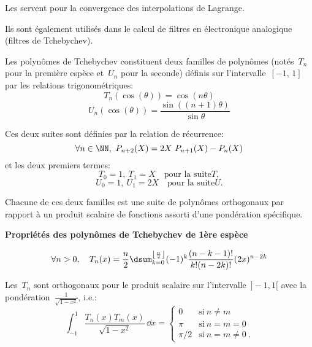 Les  servent pour la convergence des interpolations de Lagrange.

Ils sont également utilisés dans le calcul de filtres en électronique analogique (filtres de Tchebychev).

\medskip
Les polynômes de Tchebychev 
constituent deux familles de polynômes (notés~$T_n$ 
pour la première espèce et~$U_n$ pour la seconde) définis sur l'intervalle~$[-1,\, 1]$ par 
les relations trigonométriques:
\begin{equation}
  T_n(\cos(\theta))=\cos(n\theta)
\end{equation}
\begin{equation}
  U_n(\cos(\theta))=\frac{\sin((n+1) \theta)}{\sin \theta}
\end{equation}

Ces deux suites sont définies par la relation de récurrence:
\begin{equation}
  \forall n\in\NN,~P_{n+2}(X)=2X~P_{n+1}(X)-P_n(X)
\end{equation}
et les deux premiers termes:
\begin{equation}
  T_0=1,~T_1=X \quad \text{pour la suite} T,
\end{equation}
\begin{equation}
  U_0=1,~U_1=2X \quad \text{pour la suite} U.
\end{equation}

Chacune de ces deux familles est une suite de polynômes orthogonaux 
par rapport à un produit scalaire de fonctions assorti d'une pondération spécifique.

\medskip
\textbf{Propriétés des polynômes de Tchebychev de 1ère espèce}

\begin{equation}
\forall n>0, \quad
  T_n(x)=\dfrac n2\dsum_{k=0}^{\left\lfloor \frac n2\right\rfloor}(-1)^k \frac{(n-k-1)!}{k!(n-2k)!}(2x)^{n-2k}
\end{equation}

Les~$T_n$ sont orthogonaux pour le produit scalaire sur l'intervalle~$]-1,1[$ avec la 
pondération~$\frac1{\sqrt{1-x^2}}$, i.e.:
\begin{equation}
  \int_{-1}^1 \frac{T_n(x)T_m(x)}{\sqrt{1-x^2}}\,\dd x= \begin{cases} 0&\text{si}~n\ne m\\ \pi&\text{si}~n=m=0\\ \pi/2&\text{si}~n=m\ne 0~. \end{cases} 
\end{equation}

